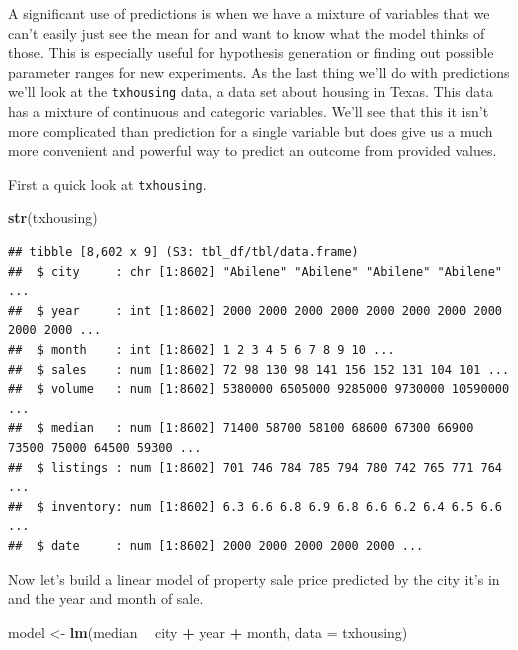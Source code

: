 \documentclass[
]{book}
\newenvironment{Shaded}{\begin{snugshade}}{\end{snugshade}}
\newcommand{\DataTypeTok}[1]{\textcolor[rgb]{0.13,0.29,0.53}{#1}}
\newcommand{\KeywordTok}[1]{\textcolor[rgb]{0.13,0.29,0.53}{\textbf{#1}}}
\newcommand{\NormalTok}[1]{#1}
\newcommand{\OperatorTok}[1]{\textcolor[rgb]{0.81,0.36,0.00}{\textbf{#1}}}
\newcommand{\StringTok}[1]{\textcolor[rgb]{0.31,0.60,0.02}{#1}}
\begin{document}
A significant use of predictions is when we have a mixture of variables that we can't easily just see the mean for and want to know what the model thinks of those. This is especially useful for hypothesis generation or finding out possible parameter ranges for new experiments. As the last thing we'll do with predictions we'll look at the \texttt{txhousing} data, a data set about housing in Texas. This data has a mixture of continuous and categoric variables. We'll see that this it isn't more complicated than prediction for a single variable but does give us a much more convenient and powerful way to predict an outcome from provided values.

First a quick look at \texttt{txhousing}.

\begin{Shaded}
\begin{Highlighting}[]
\KeywordTok{str}\NormalTok{(txhousing)}
\end{Highlighting}
\end{Shaded}

\begin{verbatim}
## tibble [8,602 x 9] (S3: tbl_df/tbl/data.frame)
##  $ city     : chr [1:8602] "Abilene" "Abilene" "Abilene" "Abilene" ...
##  $ year     : int [1:8602] 2000 2000 2000 2000 2000 2000 2000 2000 2000 2000 ...
##  $ month    : int [1:8602] 1 2 3 4 5 6 7 8 9 10 ...
##  $ sales    : num [1:8602] 72 98 130 98 141 156 152 131 104 101 ...
##  $ volume   : num [1:8602] 5380000 6505000 9285000 9730000 10590000 ...
##  $ median   : num [1:8602] 71400 58700 58100 68600 67300 66900 73500 75000 64500 59300 ...
##  $ listings : num [1:8602] 701 746 784 785 794 780 742 765 771 764 ...
##  $ inventory: num [1:8602] 6.3 6.6 6.8 6.9 6.8 6.6 6.2 6.4 6.5 6.6 ...
##  $ date     : num [1:8602] 2000 2000 2000 2000 2000 ...
\end{verbatim}

Now let's build a linear model of property sale price predicted by the city it's in and the year and month of sale.

\begin{Shaded}
\begin{Highlighting}[]
\NormalTok{model <-}\StringTok{ }\KeywordTok{lm}\NormalTok{(median }\OperatorTok{~}\StringTok{ }\NormalTok{city }\OperatorTok{+}\StringTok{ }\NormalTok{year }\OperatorTok{+}\StringTok{ }\NormalTok{month, }\DataTypeTok{data =}\NormalTok{ txhousing)}
\end{Highlighting}
\end{Shaded}
\end{document}
